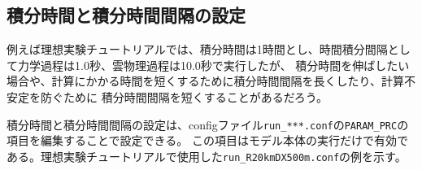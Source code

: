 

\subsection{積分時間と積分時間間隔の設定} \label{sec:adv_timeintiv}
例えば理想実験チュートリアルでは、積分時間は1時間とし、時間積分間隔として力学過程は1.0秒、雲物理過程は10.0秒で実行したが、
積分時間を伸ばしたい場合や、計算にかかる時間を短くするために積分時間間隔を長くしたり、計算不安定を防ぐために
積分時間間隔を短くすることがあるだろう。

積分時間と積分時間間隔の設定は、configファイル\verb|run_***.conf|の\verb|PARAM_PRC|の項目を編集することで設定できる。
この項目はモデル本体の実行だけで有効である。理想実験チュートリアルで使用した\verb|run_R20kmDX500m.conf|の例を示す。\\


